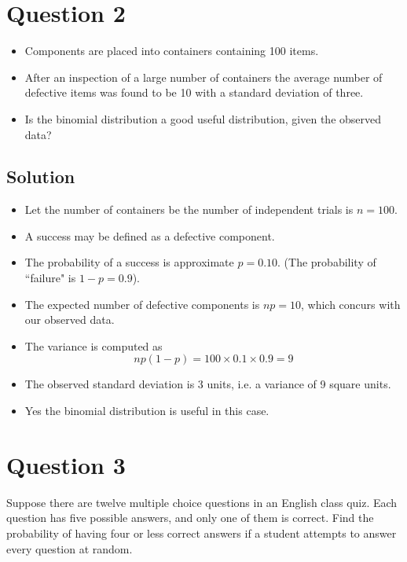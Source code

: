 \documentclass[a4paper,12pt]{article}
\begin{document}
\section*{Question 2}

\begin{itemize}
	\item Components are placed into containers containing 100 items.
	\item After an inspection of a large number of containers the average number of defective items was found to be 10 with a standard deviation of three.
	\item Is the binomial distribution a good useful distribution, given the observed data?
\end{itemize}




\subsection*{Solution}

\begin{itemize}
	\item Let the number of containers be the number of independent trials is $n=100$.
	\item A success may be defined as a defective component.
	\item The probability of a success is approximate $p=0.10$. (The probability of ``failure" is $1-p=0.9$).
	\item The expected number of defective components is $np=10$, which concurs with our observed data.
	\item The variance is computed as \[np(1-p) = 100 \times 0.1 \times 0.9 = 9\]
	\item The observed standard deviation is 3 units, i.e. a variance of 9 square units.
	\item Yes the binomial distribution is useful in this case.
\end{itemize}

\section*{Question 3}

Suppose there are twelve multiple choice questions in an English class quiz. Each question has five possible answers, and only one of them is correct. Find the probability of having four or less correct answers if a student attempts to answer every question at random.
\end{document}
